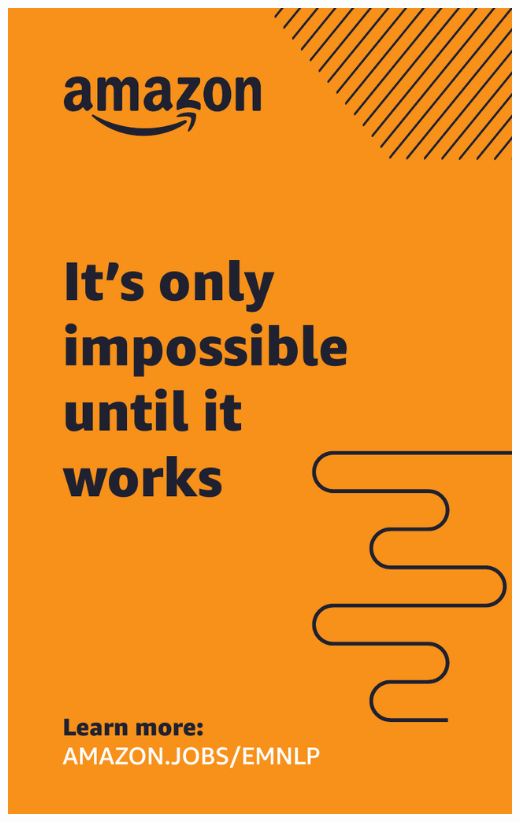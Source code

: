 \thispagestyle{empty}
\begin{center}
  \vfill
  \includegraphics[width=\textwidth]{content/ads/full/amazon.pdf}
  \vfill
\end{center}

